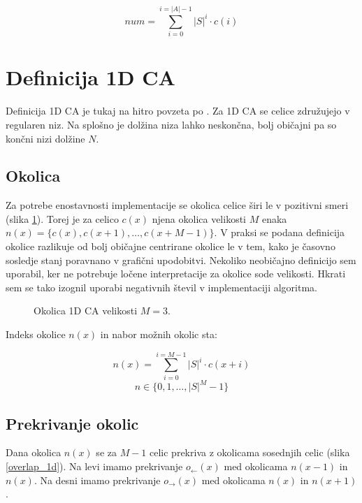 \documentclass[12pt,a4paper,openany,twoside]{book}
\begin{document}
\begin{equation}
num = \sum_{i=0}^{i=|A|-1} |S|^i \cdot c(i)
\end{equation}

\section{Definicija 1D CA}

Definicija 1D CA je tukaj na hitro povzeta po \cite{JerasDobnikar2007}.
Za 1D CA se celice združujejo v regularen niz.
Na splošno je dolžina niza lahko neskončna,
bolj običajni pa so končni nizi dolžine \(N\).

\subsection{Okolica}

Za potrebe enostavnosti implementacije se okolica celice širi le v pozitivni smeri (slika \ref{neighborhood_1d}).
Torej je za celico \(c(x)\) njena okolica velikosti \(M\) enaka
\(n(x) = \{c(x), c(x+1), \ldots, c(x+M-1)\}\).
V praksi se podana definicija okolice razlikuje od
bolj običajne centrirane okolice le v tem,
kako je časovno sosledje stanj poravnano v grafični upodobitvi.
Nekoliko neobičajno definicijo sem uporabil,
ker ne potrebuje ločene interpretacije za okolice sode velikosti.
Hkrati sem se tako izognil uporabi negativnih števil v implementaciji algoritma.

\begin{figure}[htb]
\centerline{}
\caption[Okolica 1D CA.]{Okolica 1D CA velikosti \(M=3\).}
\label{neighborhood_1d}
\end{figure}

Indeks okolice \(n(x)\) in nabor možnih okolic sta:

\begin{equation}
n(x) = \sum_{i=0}^{i=M-1} |S|^i \cdot c(x+i)
\end{equation}
\begin{equation}
n \in \{0, 1, \ldots, |S|^M-1\}
\end{equation}

\subsection{Prekrivanje okolic}

Dana okolica \(n(x)\) se za \(M-1\) celic prekriva z okolicama sosednjih celic (slika \ref{overlap_1d}).
Na levi imamo prekrivanje \(o_{\leftarrow}(x)\) med okolicama \(n(x-1)\) in \(n(x)\).
Na desni imamo prekrivanje \(o_{\rightarrow}(x)\) med okolicama \(n(x)\) in \(n(x+1)\).
\end{document}
